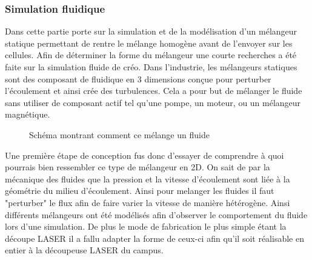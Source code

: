 \documentclass[a4paper, 11pt]{article}
\begin{document}
\subsubsection{Simulation fluidique}
Dans cette partie porte sur la simulation et de la modélisation d'un mélangeur statique 
permettant de rentre le mélange homogène avant de l'envoyer sur les cellules.
Afin de déterminer la forme du mélangeur une courte recherches a été faite sur la simulation fluide de créo.
Dans l'industrie, les mélangeurs statiques sont des composant de fluidique en 3 dimensions conçue pour 
perturber l'écoulement et ainsi crée des turbulences.
Cela a pour but de mélanger le fluide sans utiliser de composant actif tel qu'une pompe, un moteur, 
ou un mélangeur magnétique.
\begin{figure}[H]
    \centering
    \caption{Schéma montrant comment ce mélange un fluide}
    \label{fig:simulation1}
\end{figure}
Une première étape de conception fus donc d'essayer de comprendre à quoi pourrais bien ressembler ce 
type de mélangeur en 2D.
On sait de par la mécanique des fluides que la pression et la vitesse d'écoulement sont liée à la 
géométrie du milieu d'écoulement. Ainsi pour melanger les fluides il faut "perturber" le flux afin de faire
varier la vitesse de manière hétérogène.
Ainsi différents mélangeurs ont été modélisés afin d'observer le comportement du fluide lors 
d'une simulation.
De plus le mode de fabrication le plus simple étant la découpe LASER il a fallu adapter la forme 
de ceux-ci afin qu'il soit réalisable en entier à la découpeuse LASER du campus.
\end{document}

